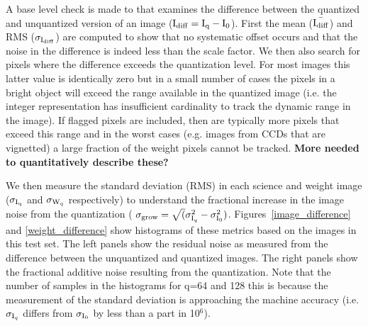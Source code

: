 A base level check is made to that examines the difference between the quantized and unquantized version
of an image (${\rm I}_{\rm diff} = {\rm I}_{\rm q}-{\rm I}_{\rm 0}$).  First the mean  
($\bar{{\rm I}_{\rm diff}}$) and RMS ($\sigma_{{\rm I}_{\rm diff}}$) are computed to show that no
systematic offset occurs and that the noise in the difference is indeed less than the scale factor.
We then also search for pixels where the difference exceeds the quantization level.  For most images
this latter value is identically zero but in a small number of cases the pixels in a bright object
will exceed the range available in the quantized image (i.e. the integer representation has insufficient
cardinality to track the dynamic range in the image).  If flagged pixels are included, then are typically
more pixels that exceed this range and in the worst cases (e.g. images from CCDs that are vignetted) a
large fraction of the weight pixels cannot be tracked.
{\bf More needed to quantitatively describe these?}

We then measure the standard deviation (RMS) in each science and weight image ($\sigma_{{\rm I}_{\rm q}}$ 
and $\sigma_{{\rm W}_{q}}$ respectively) to understand the fractional increase in the image noise
from the quantization ( $\sigma_{\rm grow} = \sqrt(\sigma_{{\rm I}_{q}}^2 - \sigma_{{\rm I}_{0}}^2 )$.  
Figures~\ref{image_difference} and \ref{weight_difference} show histograms of these metrics based
on the images in this test set.  The left panels show the residual noise as measured from the difference
between the unquantized and quantized images.  The right panels show the fractional additive noise 
resulting from the quantization.  Note that the number of samples in the histograms for q=64 and 128 
this is because the measurement of the standard deviation is approaching the machine accuracy (i.e. 
$\sigma_{{\rm I}_{q}}$ differs from $\sigma_{{\rm I}_{0}}$ by less than a part in 10$^{6}$).

